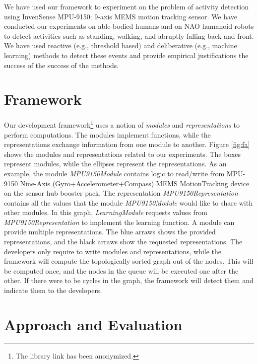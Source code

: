 \documentclass[letterpaper]{article}
\begin{document}
We have used our framework to experiment on the problem of activity
detection using InvenSense MPU-9150: 9-axis MEMS motion tracking sensor. We have conducted our
experiments on able-bodied humans and on NAO humanoid robots to detect activities such as standing,
walking, and abruptly falling back and front. We have used reactive (e.g., threshold based) 
and deliberative (e.g., machine learning) methods to detect these events and provide empirical  
justifications the success of the success of the methods. 


\section{Framework}

Our development framework\footnote{The library link has been anonymized.} uses a 
notion of 
{\em modules} and {\em representations} to perform
computations. The modules implement functions, while the representations exchange information from
one module to another. Figure \ref{fig:fa} shows the modules and representations related to our 
experiments. The boxes represent modules, while the ellipses represent the representations. As an
example, the module {\em MPU9150Module} contains logic to read/write from MPU-9150 Nine-Axis
(Gyro+Accelerometer+Compass) MEMS MotionTracking device on the sensor hub booster
pack. The representation {\em MPU9150Representation} contains all the values that the module
{\em MPU9150Module} would like to share with other modules. In this graph, {\em LearningModule}
requests values from {\em MPU9150Representation} to implement the learning function. A module can 
provide multiple representations. The blue arraws shows the provided representations, and the black 
arraws show the requested representations. The developers only require to write 
modules and representations, while the framework will compute the topologically sorted graph out of 
the nodes. This will be computed once, and the nodes in the queue will be executed one after the 
other. If there were to be cycles in the graph, the framework will detect them and indicate them to 
the developers.


\section{Approach and Evaluation}
\end{document}
